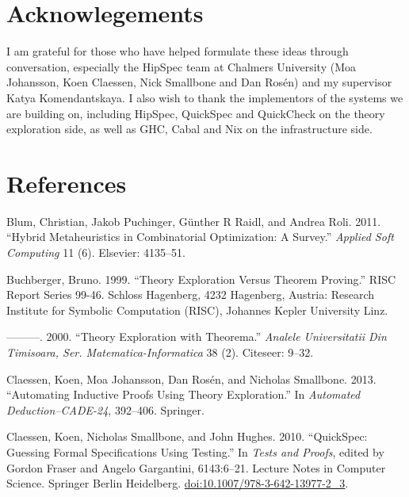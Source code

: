 \documentclass[]{article}
\begin{document}
\section{Acknowlegements}\label{acknowlegements}

I am grateful for those who have helped formulate these ideas through
conversation, especially the HipSpec team at Chalmers University (Moa
Johansson, Koen Claessen, Nick Smallbone and Dan Rosén) and my
supervisor Katya Komendantskaya. I also wish to thank the implementors
of the systems we are building on, including HipSpec, QuickSpec and
QuickCheck on the theory exploration side, as well as GHC, Cabal and Nix
on the infrastructure side.

\section*{References}\label{references}

Blum, Christian, Jakob Puchinger, Günther R Raidl, and Andrea Roli.
2011. ``Hybrid Metaheuristics in Combinatorial Optimization: A Survey.''
\emph{Applied Soft Computing} 11 (6). Elsevier: 4135--51.

Buchberger, Bruno. 1999. ``Theory Exploration Versus Theorem Proving.''
RISC Report Series 99-46. Schloss Hagenberg, 4232 Hagenberg, Austria:
Research Institute for Symbolic Computation (RISC), Johannes Kepler
University Linz.

---------. 2000. ``Theory Exploration with Theorema.'' \emph{Analele
Universitatii Din Timisoara, Ser. Matematica-Informatica} 38 (2).
Citeseer: 9--32.

Claessen, Koen, Moa Johansson, Dan Rosén, and Nicholas Smallbone. 2013.
``Automating Inductive Proofs Using Theory Exploration.'' In
\emph{Automated Deduction--CADE-24}, 392--406. Springer.

Claessen, Koen, Nicholas Smallbone, and John Hughes. 2010. ``QuickSpec:
Guessing Formal Specifications Using Testing.'' In \emph{Tests and
Proofs}, edited by Gordon Fraser and Angelo Gargantini, 6143:6--21.
Lecture Notes in Computer Science. Springer Berlin Heidelberg.
\href{http://doi.org/10.1007/978-3-642-13977-2_3}{doi:10.1007/978-3-642-13977-2\_3}.
\end{document}
